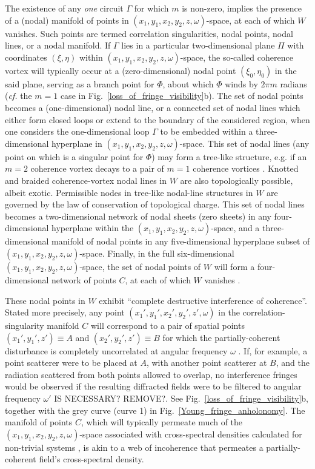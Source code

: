 \documentclass{iucr}              %
\newcommand{\inblue}[1]{{\color{blue}#1}}
\newcommand{\inred}[1]{{\color{red}#1}}
\begin{document}
The existence of any {\em one} circuit $\Gamma$ for which $m$ is non-zero, implies the presence of a (nodal) manifold of points in $(x_1,y_1,x_2,y_2,z,\omega)$-space, at each of which $W$ vanishes.   Such points are termed correlation singularities, nodal points, nodal lines, or a nodal manifold.  If $\Gamma$ lies in a particular two-dimensional plane $\Pi$ with coordinates $(\xi,\eta)$ within $(x_1,y_1,x_2,y_2,z,\omega)$-space, the so-called coherence vortex \cite{GburVisser2003} will typically occur at a (zero-dimensional) nodal point $(\xi_0,\eta_0)$ in the said plane, serving as a branch point for $\Phi$, about which $\Phi$ winds by $2 \pi m$ radians ({\em cf.} the $m=1$ case in Fig.~\ref{loss_of_fringe_visibility}b).  The set of nodal points becomes a (one-dimensional) nodal line, or a connected set of nodal lines which either form closed loops or extend to the boundary of the considered region, when one considers the one-dimensional loop $\Gamma$ to be embedded within a three-dimensional hyperplane in  $(x_1,y_1,x_2,y_2,z,\omega)$-space.  This set of nodal lines (any point on which is a singular point for $\Phi$) may form a tree-like structure, e.g. if an $m=2$ coherence vortex decays to a pair of $m=1$ coherence vortices \cite{TopologicalReactionsCohVortices,GburSPIE}.  Knotted and braided coherence-vortex nodal lines in $W$ are also topologically possible, albeit exotic.  Permissible nodes in tree-like nodal-line structures in $W$ are governed by the law of conservation of topological charge.  This set of nodal lines becomes a two-dimensional network of nodal sheets (zero sheets) in any four-dimensional hyperplane within the $(x_1,y_1,x_2,y_2,z,\omega)$-space, and a three-dimensional manifold of nodal points in any five-dimensional hyperplane subset of $(x_1,y_1,x_2,y_2,z,\omega)$-space.  Finally, in the full six-dimensional $(x_1,y_1,x_2,y_2,z,\omega)$-space, the set of nodal points of $W$ will form a four-dimensional network of points $C$, at each of which $W$ vanishes \cite{Marasinghe2010}.  

These nodal points in $W$ exhibit ``complete destructive interference of coherence''.  Stated more precisely, any point $(x_1',y_1',x_2',y_2',z',\omega)$ in the correlation-singularity manifold $C$ will correspond to a pair of spatial points $(x_1',y_1',z')\equiv A$ and $(x_2',y_2',z')\equiv B$ for which the partially-coherent disturbance is completely uncorrelated at angular frequency $\omega$ \cite{Schouten2003,GburVisser2003,Bogatyryova2003}.  If, for example, a point scatterer were to be placed at $A$, with another point scatterer at $B$, and the radiation scattered from both points allowed to overlap, no interference fringes would be observed \inred{if the resulting diffracted fields were to be filtered to angular frequency $\omega'$ IS NECESSARY? REMOVE?}.  See \inblue{Fig.~\ref{loss_of_fringe_visibility}b}, together with the grey curve (curve 1) in \inblue{Fig.~\ref{Young_fringe_anholonomy}}.  The manifold of points $C$, which will typically permeate much of the $(x_1,y_1,x_2,y_2,z,\omega)$-space associated with cross-spectral densities calculated for non-trivial systems \cite{TopologicalReactionsCohVortices,GburVisser2003}, is akin to a web of incoherence that permeates a partially-coherent field's cross-spectral density.
\end{document}
